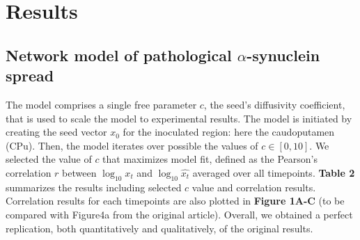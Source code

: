 \section{Results}
\subsection{Network model of pathological $\alpha$-synuclein spread}
The model comprises a single free parameter $c$, the seed's diffusivity coefficient, that is used to scale the model to experimental results. The model is initiated by creating the seed vector $x_{0}$ for the inoculated region: here the caudoputamen (CPu). Then, the model iterates over possible the values of $c \in [0, 10]$. We selected the value of $c$ that maximizes model fit, defined as the Pearson's correlation $r$ between $\log_{10}x_{t}$ and $\log_{10}\widehat{x_{t}}$ averaged over all timepoints. \textbf{Table 2} summarizes the results including selected $c$ value and correlation results. Correlation results for each timepoints are also plotted in \textbf{Figure 1A-C} (to be compared with Figure4a from the original article). Overall, we obtained a perfect replication, both quantitatively and qualitatively, of the original results. \\

